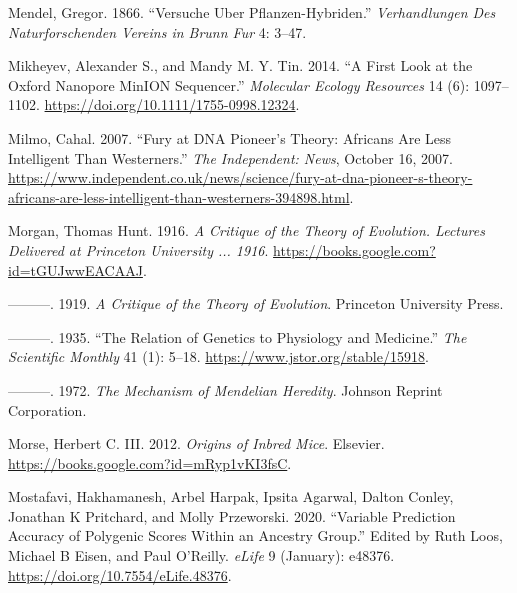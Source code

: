 \documentclass[
]{book}
\newlength{\cslhangindent}
\newlength{\cslentryspacingunit} %
\newenvironment{CSLReferences}[2] %
 {%
  \setlength{\parindent}{0pt}
  \ifodd #1
  \let\oldpar\par
  \def\par{\hangindent=\cslhangindent\oldpar}
  \fi
  \setlength{\parskip}{#2\cslentryspacingunit}
 }%
 {}
\begin{document}
\begin{CSLReferences}{1}{0}
\leavevmode{}%
Mendel, Gregor. 1866. {``Versuche Uber Pflanzen-Hybriden.''} \emph{Verhandlungen Des Naturforschenden Vereins in Brunn Fur} 4: 3--47.

\leavevmode{}%
Mikheyev, Alexander S., and Mandy M. Y. Tin. 2014. {``A First Look at the {Oxford Nanopore MinION} Sequencer.''} \emph{Molecular Ecology Resources} 14 (6): 1097--1102. \url{https://doi.org/10.1111/1755-0998.12324}.

\leavevmode{}%
Milmo, Cahal. 2007. {``Fury at {DNA} Pioneer's Theory: {Africans} Are Less Intelligent Than {Westerners}.''} \emph{The Independent: News}, October 16, 2007. \url{https://www.independent.co.uk/news/science/fury-at-dna-pioneer-s-theory-africans-are-less-intelligent-than-westerners-394898.html}.

\leavevmode{}%
Morgan, Thomas Hunt. 1916. \emph{A {Critique} of the {Theory} of {Evolution}. {Lectures Delivered} at {Princeton University} ... 1916}. \url{https://books.google.com?id=tGUJwwEACAAJ}.

\leavevmode{}%
---------. 1919. \emph{A {Critique} of the {Theory} of {Evolution}}. {Princeton University Press}.

\leavevmode{}%
---------. 1935. {``The {Relation} of {Genetics} to {Physiology} and {Medicine}.''} \emph{The Scientific Monthly} 41 (1): 5--18. \url{https://www.jstor.org/stable/15918}.

\leavevmode{}%
---------. 1972. \emph{The {Mechanism} of {Mendelian Heredity}}. {Johnson Reprint Corporation}.

\leavevmode{}%
Morse, Herbert C. III. 2012. \emph{Origins of {Inbred Mice}}. {Elsevier}. \url{https://books.google.com?id=mRyp1vKI3fsC}.

\leavevmode{}%
Mostafavi, Hakhamanesh, Arbel Harpak, Ipsita Agarwal, Dalton Conley, Jonathan K Pritchard, and Molly Przeworski. 2020. {``Variable Prediction Accuracy of Polygenic Scores Within an Ancestry Group.''} Edited by Ruth Loos, Michael B Eisen, and Paul O'Reilly. \emph{eLife} 9 (January): e48376. \url{https://doi.org/10.7554/eLife.48376}.


\end{CSLReferences}
\end{document}
